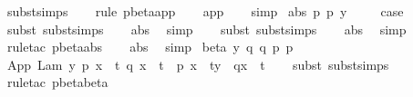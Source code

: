 \begin{isabellebody}
\ subst{\isachardot}simps\isanewline
\ \ \isamarkupfalse%
\ {\isacharparenleft}rule\ pbeta{\isachardot}app{\isacharparenright}\isanewline
\ \ \isamarkupfalse%
\ app\isanewline
\ \ \isamarkupfalse%
\ simp{\isacharplus}\isanewline
{}\isamarkupfalse%
\isanewline
{}\isamarkupfalse%
\ {\isacharparenleft}abs\ p\ p{\isacharprime}\ y{\isacharparenright}\ \isanewline
\ \ \isamarkupfalse%
\ {\isacharquery}case\ \isanewline
\ \ \isamarkupfalse%
\ {\isacharparenleft}subst\ subst{\isachardot}simps{\isacharparenright}\isanewline
\ \ \isamarkupfalse%
\ abs\ \isamarkupfalse%
\ simp\isanewline
\ \ \isamarkupfalse%
\ {\isacharparenleft}subst\ subst{\isachardot}simps{\isacharparenright}\isanewline
\ \ \isamarkupfalse%
\ abs\ \isamarkupfalse%
\ simp\isanewline
\ \ \isamarkupfalse%
\ {\isacharparenleft}rule{\isacharunderscore}tac\ pbeta{\isachardot}abs{\isacharparenright}\isanewline
\ \ \isamarkupfalse%
\ abs\ \isamarkupfalse%
\ simp\isanewline
{}\isamarkupfalse%
\isanewline
{}\isamarkupfalse%
\ {\isacharparenleft}beta\ y\ q\ q{\isacharprime}\ p\ p{\isacharprime}{\isacharparenright}\isanewline
\ \ \isamarkupfalse%
\ {\isachardoublequoteopen}App\ {\isacharparenleft}{\isacharparenleft}Lam\ {\isacharbrackleft}y{\isacharbrackright}{\isachardot}\ p{\isacharparenright}\ {\isacharbrackleft}x\ {\isacharcolon}{\isacharcolon}{\isacharequal}\ t{\isacharbrackright}{\isacharparenright}\ {\isacharparenleft}q\ {\isacharbrackleft}x\ {\isacharcolon}{\isacharcolon}{\isacharequal}\ t{\isacharbrackright}{\isacharparenright}\ {\isasymggreater}\ {\isacharparenleft}p{\isacharprime}\ {\isacharbrackleft}x\ {\isacharcolon}{\isacharcolon}{\isacharequal}\ t{\isacharprime}{\isacharbrackright}{\isacharparenright}{\isacharbrackleft}y\ {\isacharcolon}{\isacharcolon}{\isacharequal}\ q{\isacharprime}{\isacharbrackleft}x\ {\isacharcolon}{\isacharcolon}{\isacharequal}\ t{\isacharprime}{\isacharbrackright}{\isacharbrackright}{\isachardoublequoteclose}\isanewline
\ \ \isamarkupfalse%
\ {\isacharparenleft}subst\ subst{\isachardot}simps{\isacharparenleft}{}{\isacharparenright}{\isacharparenright}\isanewline
\ \ \isamarkupfalse%
\isanewline
\ \ \isamarkupfalse%
\ {\isacharparenleft}rule{\isacharunderscore}tac\ pbeta{\isachardot}beta{\isacharparenright}\isanewline

\end{isabellebody}
